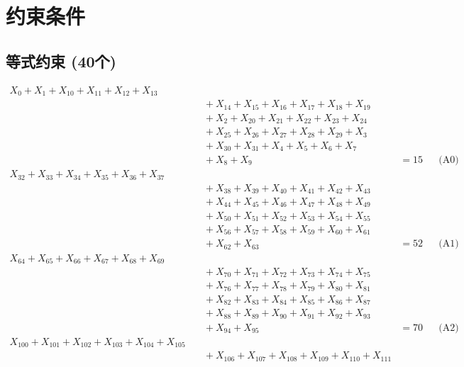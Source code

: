 \documentclass[a4paper,10pt]{article}
\begin{document}
\section{约束条件}

\subsection{等式约束 (40个)}

\allowdisplaybreaks
{\small\begin{align}
X_{0} + X_{1} + X_{10} + X_{11} + X_{12} + X_{13} \\[0.5ex]
&\quad  + X_{14} + X_{15} + X_{16} + X_{17} + X_{18} + X_{19} \\[0.5ex]
&\quad  + X_{2} + X_{20} + X_{21} + X_{22} + X_{23} + X_{24} \\[0.5ex]
&\quad  + X_{25} + X_{26} + X_{27} + X_{28} + X_{29} + X_{3} \\[0.5ex]
&\quad  + X_{30} + X_{31} + X_{4} + X_{5} + X_{6} + X_{7} \\[0.5ex]
&\quad  + X_{8} + X_{9} &= 15 && \text{(A0)} \\
X_{32} + X_{33} + X_{34} + X_{35} + X_{36} + X_{37} \\[0.5ex]
&\quad  + X_{38} + X_{39} + X_{40} + X_{41} + X_{42} + X_{43} \\[0.5ex]
&\quad  + X_{44} + X_{45} + X_{46} + X_{47} + X_{48} + X_{49} \\[0.5ex]
&\quad  + X_{50} + X_{51} + X_{52} + X_{53} + X_{54} + X_{55} \\[0.5ex]
&\quad  + X_{56} + X_{57} + X_{58} + X_{59} + X_{60} + X_{61} \\[0.5ex]
&\quad  + X_{62} + X_{63} &= 52 && \text{(A1)} \\
X_{64} + X_{65} + X_{66} + X_{67} + X_{68} + X_{69} \\[0.5ex]
&\quad  + X_{70} + X_{71} + X_{72} + X_{73} + X_{74} + X_{75} \\[0.5ex]
&\quad  + X_{76} + X_{77} + X_{78} + X_{79} + X_{80} + X_{81} \\[0.5ex]
&\quad  + X_{82} + X_{83} + X_{84} + X_{85} + X_{86} + X_{87} \\[0.5ex]
&\quad  + X_{88} + X_{89} + X_{90} + X_{91} + X_{92} + X_{93} \\[0.5ex]
&\quad  + X_{94} + X_{95} &= 70 && \text{(A2)} \\
X_{100} + X_{101} + X_{102} + X_{103} + X_{104} + X_{105} \\[0.5ex]
&\quad  + X_{106} + X_{107} + X_{108} + X_{109} + X_{110} + X_{111} \\[0.5ex]

\end{align}}
\end{document}
